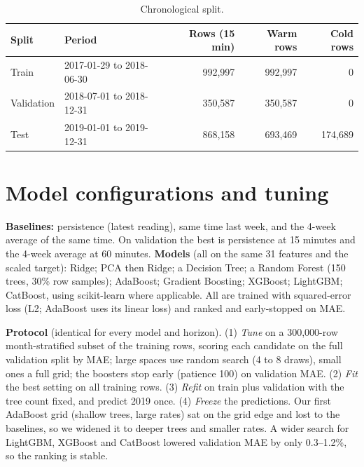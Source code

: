 ﻿\documentclass[11pt,a4paper]{article}
\begin{document}
\begin{table}[H]\centering\small
\begin{tabular}{llrrr}
\toprule Split & Period & Rows (15 min) & Warm rows & Cold rows \\ \midrule
Train & 2017-01-29 to 2018-06-30 & 992,997 & 992,997 & 0 \\
Validation & 2018-07-01 to 2018-12-31 & 350,587 & 350,587 & 0 \\
Test & 2019-01-01 to 2019-12-31 & 868,158 & 693,469 & 174,689 \\ \bottomrule
\end{tabular}
\caption{Chronological split.}\label{tab:split}
\end{table}

\section{Model configurations and tuning}
\textbf{Baselines:} persistence (latest reading), same time last week, and the 4-week average of the same time. On validation the best is
persistence at 15 minutes and the 4-week average at 60 minutes. \textbf{Models} (all on the same 31 features and the scaled target):
Ridge; PCA then Ridge; a Decision Tree; a Random Forest (150 trees, 30\% row samples);
AdaBoost; Gradient Boosting; XGBoost; LightGBM; CatBoost, using scikit-learn where applicable. All are trained with squared-error loss (L2; AdaBoost uses its linear loss) and ranked and early-stopped on MAE.

\textbf{Protocol} (identical for every model and horizon). (1) \emph{Tune} on a 300,000-row month-stratified subset of the training rows,
scoring each candidate on the full validation split by MAE; large spaces use random search (4 to 8 draws), small ones a full grid; the boosters stop early
(patience 100) on validation MAE. (2) \emph{Fit} the best setting on all training rows. (3) \emph{Refit} on train plus validation with the tree count fixed,
and predict 2019 once. (4) \emph{Freeze} the predictions. Our first AdaBoost grid (shallow trees, large rates) sat on the grid edge and lost to the baselines, so we widened it to deeper trees and smaller rates.
A wider search for LightGBM, XGBoost and CatBoost lowered validation MAE by only 0.3--1.2\%, so the ranking is stable.
\end{document}
